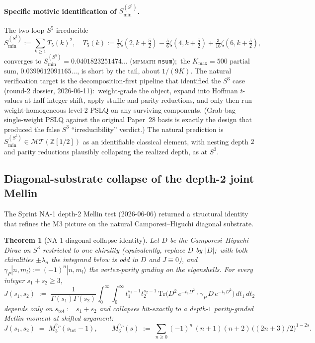 \documentclass[11pt,a4paper]{article}
\theoremstyle{plain}
\newtheorem{theorem}{Theorem}[section]
\theoremstyle{definition}
\newcommand{\sthree}{S^{3}}
\newcommand{\sfive}{S^{5}}
\newcommand{\Z}{\mathbb{Z}}
\newcommand{\Tr}{\mathrm{Tr}}
\newcommand{\MT}{\mathcal{MT}}
\begin{document}
\paragraph{Specific motivic identification of $S_{\min}^{(\sfive)}$.}
The two-loop $\sfive$ irreducible
\[
S_{\min}^{(\sfive)} := \sum_{k \ge 1} T_5(k)^2, \quad
T_5(k) := \tfrac{1}{3}\zeta(2, k + \tfrac{5}{2})
        - \tfrac{5}{6}\zeta(4, k + \tfrac{5}{2})
        + \tfrac{3}{16}\zeta(6, k + \tfrac{5}{2}),
\]
converges to $S_{\min}^{(\sfive)} = 0.0401823251474\ldots$
(\textsc{mpmath} \texttt{nsum});\ the $K_{\max} = 500$ partial sum,
$0.0399612091165\ldots$, is short by the tail, about $1/(9K)$.  The natural verification target is the
decomposition-first pipeline that identified the $\sthree$ case
(round-2 dossier, 2026-06-11):\ weight-grade the object, expand into
Hoffman $t$-values at half-integer shift, apply stuffle and parity
reductions, and only then run weight-homogeneous level-2 PSLQ on any
surviving components.  (Grab-bag single-weight PSLQ against the
original Paper~28 basis is exactly the design that produced the false
$\sthree$ ``irreducibility'' verdict.)  The natural prediction is
$S_{\min}^{(\sfive)} \in \MT(\Z[1/2])$ as an identifiable classical
element, with nesting depth $2$ and parity reductions plausibly
collapsing the realized depth, as at $\sthree$.

\subsection{Diagonal-substrate collapse of the depth-2 joint Mellin}
\label{subsec:m3_diagonal_collapse}

The Sprint NA-1 depth-2 Mellin test
(2026-06-06)
returned a structural identity that refines the M3 picture on the
natural Camporesi--Higuchi diagonal substrate.

\begin{theorem}[NA-1 diagonal-collapse identity]
\label{thm:na1_diagonal_collapse}
Let $D$ be the Camporesi--Higuchi Dirac on $\sthree$ restricted to one
chirality (equivalently, replace $D$ by $|D|$;\ with both chiralities
$\pm\lambda_n$ the integrand below is odd in $D$ and $J \equiv 0$), and
$\gamma_P |n, m_l\rangle := (-1)^n |n, m_l\rangle$ the
vertex-parity grading on the eigenshells. For every integer
$s_1 + s_2 \ge 3$,
\begin{equation}
\label{eq:na1_J}
J(s_1, s_2) \;:=\; \frac{1}{\Gamma(s_1)\Gamma(s_2)}
\int_0^\infty\!\!\!\int_0^\infty t_1^{s_1 - 1} t_2^{s_2 - 1}\,
\Tr\!\big(D^2\, e^{-t_1 D^2}\cdot \gamma_P\, D\, e^{-t_2 D^2}\big)\,
dt_1\, dt_2
\end{equation}
depends only on $s_{\mathrm{tot}} := s_1 + s_2$ and collapses
bit-exactly to a depth-$1$ parity-graded Mellin moment at shifted
argument:
\begin{equation}
\label{eq:na1_collapse}
J(s_1, s_2) \;=\; M_3^{\gamma_P}(s_{\mathrm{tot}} - 1),
\qquad
M_3^{\gamma_P}(s) \;:=\; \sum_{n \ge 0} (-1)^n\,(n + 1)(n + 2)\,
\big((2n + 3)/2\big)^{1 - 2s}.
\end{equation}
\end{theorem}
\end{document}
